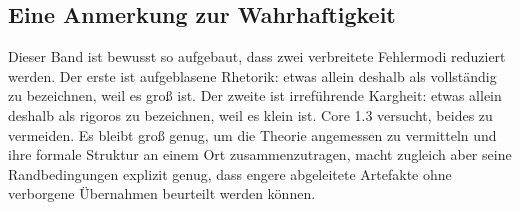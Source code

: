 \subsection{Eine Anmerkung zur Wahrhaftigkeit}

Dieser Band ist bewusst so aufgebaut, dass zwei verbreitete Fehlermodi reduziert werden.
Der erste ist aufgeblasene Rhetorik: etwas allein deshalb als vollständig zu bezeichnen, weil es
groß ist.
Der zweite ist irreführende Kargheit: etwas allein deshalb als rigoros zu bezeichnen, weil es
klein ist.
Core 1.3 versucht, beides zu vermeiden.
Es bleibt groß genug, um die Theorie angemessen zu vermitteln und ihre formale Struktur an einem
Ort zusammenzutragen, macht zugleich aber seine Randbedingungen explizit genug, dass engere
abgeleitete Artefakte ohne verborgene Übernahmen beurteilt werden können.

\clearpage
